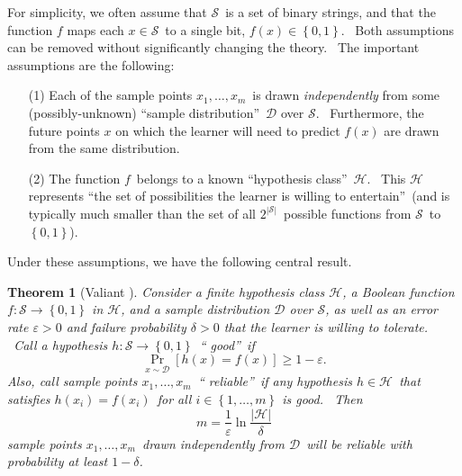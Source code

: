 \documentclass[11pt,onecolumn]{article}%
\newtheorem{theorem}{Theorem}
\begin{document}
For simplicity, we often assume that $\mathcal{S}$\ is a set of binary
strings, and that the function $f$ maps each $x\in\mathcal{S}$\ to a single
bit, $f\left(  x\right)  \in\left\{  0,1\right\}  $. \ Both assumptions can be
removed without significantly changing the theory. \ The important assumptions
are the following:

\begin{enumerate}
\item[(1)] Each of the sample points $x_{1},\ldots,x_{m}$\ is drawn
\textit{independently} from some (possibly-unknown) \textquotedblleft sample
distribution\textquotedblright\ $\mathcal{D}$ over $\mathcal{S}$.
\ Furthermore, the future points $x$ on which the learner will need to predict
$f\left(  x\right)  $ are drawn from the same distribution.

\item[(2)] The function $f$\ belongs to a known \textquotedblleft hypothesis
class\textquotedblright\ $\mathcal{H}$. \ This $\mathcal{H}$ represents
\textquotedblleft the set of possibilities the learner is willing to
entertain\textquotedblright\ (and is typically much smaller than the set of
all $2^{\left\vert \mathcal{S}\right\vert }$\ possible functions from
$\mathcal{S}$\ to $\left\{  0,1\right\}  $).
\end{enumerate}

Under these assumptions, we have the following central result.

\begin{theorem}
[Valiant \cite{valiant:pac}]\label{valthm}Consider a finite hypothesis class
$\mathcal{H}$, a Boolean function $f:\mathcal{S}\rightarrow\left\{
0,1\right\}  $ in $\mathcal{H}$, and a sample distribution $\mathcal{D}$ over
$\mathcal{S}$, as well as an error rate $\varepsilon>0$ and failure
probability $\delta>0$ that the learner is willing to tolerate. \ Call a
hypothesis $h:\mathcal{S}\rightarrow\left\{  0,1\right\}  $\ \textquotedblleft
good\textquotedblright\ if%
\[
\Pr_{x\sim\mathcal{D}}\left[  h\left(  x\right)  =f\left(  x\right)  \right]
\geq1-\varepsilon.
\]
Also, call sample points $x_{1},\ldots,x_{m}$\ \textquotedblleft
reliable\textquotedblright\ if any hypothesis $h\in\mathcal{H}$\ that
satisfies $h\left(  x_{i}\right)  =f\left(  x_{i}\right)  $\ for all
$i\in\left\{  1,\ldots,m\right\}  $ is good. \ Then%
\[
m=\frac{1}{\varepsilon}\ln\frac{\left\vert \mathcal{H}\right\vert }{\delta}%
\]
sample points $x_{1},\ldots,x_{m}$\ drawn independently from $\mathcal{D}%
$\ will be reliable with probability at least $1-\delta$.
\end{theorem}
\end{document}
